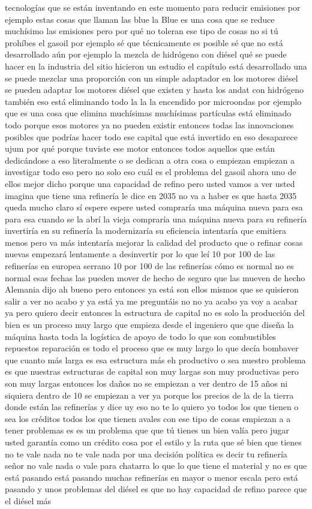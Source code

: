 tecnologías que se están inventando en este momento para reducir emisiones por ejemplo estas cosas que llaman las blue la Blue es una cosa que se reduce muchísimo las emisiones pero por qué no toleran ese tipo de cosas no si tú prohíbes el gasoil por ejemplo sé que técnicamente es posible sé que no está desarrollado aún por ejemplo la mezcla de hidrógeno con diésel qué se puede hacer en la industria del sitio hicieron un estudio el capítulo está desarrollado una se puede mezclar una proporción con un simple adaptador en los motores diésel se pueden adaptar los motores diésel que existen y hasta los andat con hidrógeno también eso está eliminando todo la la la encendido por microondas por ejemplo que es una cosa que elimina muchísimas muchísimas partículas está eliminado todo porque esos motores ya no pueden existir entonces todas las innovaciones posibles que podrías hacer todo ese capital que está invertido en eso desaparece ujum por qué porque tuviste ese motor entonces todos aquellos que están dedicándose a eso literalmente o se dedican a otra cosa o empiezan empiezan a investigar todo eso pero no solo eso cuál es el problema del gasoil ahora uno de ellos mejor dicho porque una capacidad de refino pero usted vamos a ver usted imagina que tiene una refinería le dice en 2035 no va a haber es que hasta 2035 queda mucho claro sí espere espere usted compraría una máquina nueva para esa para esa cuando se la abrí la vieja compraría una máquina nueva para su refinería invertiría en su refinería la modernizaría su eficiencia intentaría que emitiera menos pero va más intentaría mejorar la calidad del producto que o refinar cosas nuevas empezará lentamente a desinvertir por lo que leí 10 por 100 de las refinerías en europea serrano 10 por 100 de las refinerías cómo es normal no es normal esas fechas las pueden mover de hecho de seguro que las mueven de hecho Alemania dijo ah bueno pero entonces ya está son ellos mismos que se quisieron salir a ver no acabo y ya está ya me preguntáis no no ya acabo ya voy a acabar ya pero quiero decir entonces la estructura de capital no es solo la producción del bien es un proceso muy largo que empieza desde el ingeniero que que diseña la máquina hasta toda la logística de apoyo de todo lo que son combustibles repuestos reparación es todo el proceso que es muy largo lo que decía bombaver que cuanto más larga es esa estructura más eh productivo o sea nuestro problema es que nuestras estructuras de capital son muy largas son muy productivas pero son muy largas entonces los daños no se empiezan a ver dentro de 15 años ni siquiera dentro de 10 se empiezan a ver ya porque los precios de la de la tierra donde están las refinerías y dice uy eso no te lo quiero yo todos los que tienen o sea los créditos todos los que tienen avales con ese tipo de cosas empiezan a a tener problemas es es un problema que que tú tienes un bien valía pero jugar usted garantía como un crédito cosa por el estilo y la ruta que sé bien que tienes no te vale nada no te vale nada por una decisión política es decir tu refinería señor no vale nada o vale para chatarra lo que lo que tiene el material y no es que está pasando está pasando muchas refinerías en mayor o menor escala pero está pasando y unos problemas del diésel es que no hay capacidad de refino parece que el diésel más 